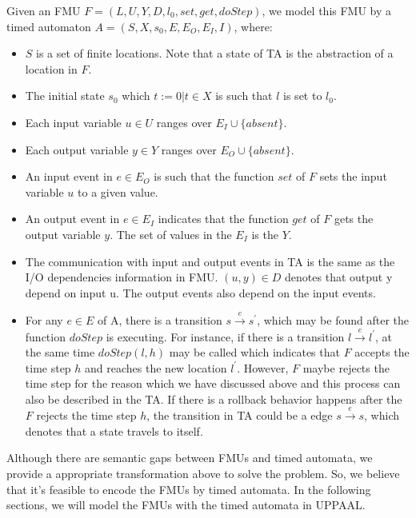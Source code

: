 Given an FMU $F=(L,U,Y,D,l_{0},set,get,doStep)$, we model this FMU by a timed automaton $A = (S,X,s_{0},E,E_{O},E_{I},I)$, where:
\begin{itemize}
\item
$S$ is a set of finite locations. Note that a state of TA is the abstraction of a location in $F$.
\item
The initial state $s_{0}$ which $t:=0 \vert t \in X$ is such that $l$ is set to $l_{0}$. 
\item
Each input variable $u \in U$ ranges over $E_{I} \cup \{absent\}$.
\item
Each output variable $y \in Y$ ranges over $E_{O} \cup \{absent\}$.
\item
An input event in $e \in E_{O}$ is such that the function $set$ of $F$ sets the input variable $u$ to a given value. 
\item
An output event in $e \in E_{I}$ indicates that the function $get$ of $F$ gets the output variable $y$. The set of values in the $E_{I}$ is the $Y$.  
\item
The communication with input and output events in TA is the same as the I/O dependencies information in FMU. $(u,y) \in D$ denotes that output y depend on input u. The output events also depend on the input events.
\item
For any $e \in E$ of A, there is a transition $s \xrightarrow{e} s^{\prime}$, which may be found after the function $doStep$ is executing. For instance, if there is a transition $l \xrightarrow{e} l^{\prime}$, at the same time $doStep(l,h)$ may be called which indicates that $F$ accepts the time step $h$ and reaches the new location $l^{\prime}$. However, $F$ maybe rejects the time step for the reason which we have discussed above and this process can also be described in the TA. If there is a rollback behavior happens after the $F$ rejects the time step $h$, the transition in TA could be a edge $s \xrightarrow{e} s$, which denotes that a state travels to itself.
\end{itemize}

%
Although there are semantic gaps between FMUs and timed automata, we provide a  appropriate transformation above to solve the problem. So, we believe that it's feasible to encode the FMUs by timed automata. In the following sections, we will model the FMUs with the timed automata in UPPAAL.


